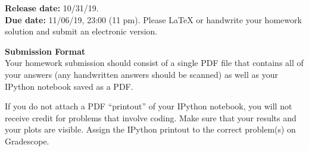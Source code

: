 

\def\title{Homework 9}

\newcommand{\qitem}{\qpart\item}

\renewcommand{\labelenumi}{(\alph{enumi})} %
\renewcommand{\theenumi}{(\alph{enumi})} %
\renewcommand{\labelenumii}{\roman{enumii}.} %
\renewcommand{\theenumii}{\roman{enumii}.}

\maketitle






\noindent
{\bf Release date:} 10/31/19.\\
{\bf Due date:}  11/06/19, 23:00 (11 pm). Please \LaTeX{} or handwrite your homework solution and submit an electronic version. 

\textbf{Submission Format} \\
Your homework submission should consist of a single PDF file that contains all of your answers (any handwritten answers should be scanned) as well as your IPython notebook saved as a PDF.
			
If you do not attach a PDF ``printout'' of your IPython notebook, you will not receive credit for problems that involve coding. Make sure that your results and your plots are visible. Assign the IPython printout to the correct problem(s) on Gradescope.

\begin{qunlist}
% 

\newpage

\newpage

\newpage


\end{qunlist}

